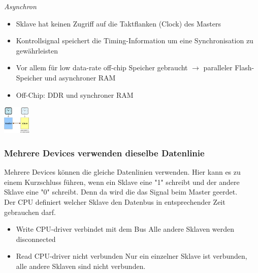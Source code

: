 \documentclass{article}
\newenvironment{Figure}
	{\par\medskip\noindent\minipage{\linewidth}}
	{\endminipage\par\medskip}
\begin{document}
\textit{Asynchron}\\
\begin{itemize}
\item Sklave hat keinen Zugriff auf die Taktflanken (Clock) des Masters
\item Kontrollsignal speichert die Timing-Information um eine Synchronisation zu gewährleisten
\item Vor allem für low data-rate off-chip Speicher gebraucht $\rightarrow$ paralleler Flash-Speicher und asynchroner RAM
\item Off-Chip: DDR und synchroner RAM
\end{itemize}
\begin{Figure}
\centering
\includegraphics[width=50px]{img/BusTimingAsynchron.png}
	\label{fig:Asynchrones Bus Timing}
\end{Figure}

\subsubsection{Mehrere Devices verwenden dieselbe Datenlinie}
Mehrere Devices können die gleiche Datenlinien verwenden. Hier kann es zu einem Kurzschluss führen, wenn ein Sklave eine "1" schreibt und der andere Sklave eine "0" schreibt. Denn da wird die das Signal beim Master geerdet.\\
Der CPU definiert welcher Sklave den Datenbus in entsprechender Zeit gebrauchen darf. 
\begin{itemize}
	\item Write		CPU-driver verbindet mit dem Bus		Alle andere Sklaven werden disconnected
	\item Read		CPU-driver nicht verbunden			Nur ein einzelner Sklave ist verbunden, alle andere Sklaven sind nicht verbunden.
\end{itemize}
\end{document}
